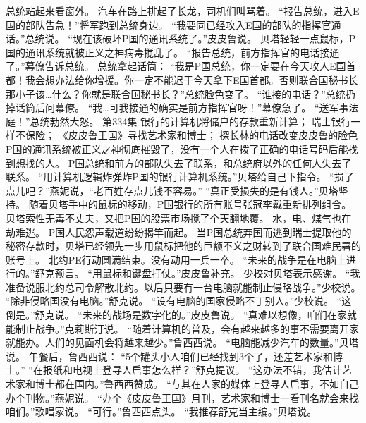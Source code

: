 \documentclass[a4paper,12pt,UTF8,twoside]{ctexbook}
\begin{document}
        总统站起来看窗外。  
        汽车在路上排起了长龙，司机们叫骂着。  
        “报告总统，进入E国的部队告急！”将军跑到总统身边。  
        “我要同已经攻入E国的部队的指挥官通话。”总统说。  
        “现在该破坏P国的通讯系统了。”皮皮鲁说。  
        贝塔轻轻一点鼠标，P国的通讯系统就被正义之神病毒搅乱了。  
        “报告总统，前方指挥官的电话接通了。”幕僚告诉总统。  
        总统拿起话筒：  
      “我是P国总统，你一定要在今天攻人E国首都！我会想办法给你增援。你一定不能迟于今天拿下E国首都。否则联合国秘书长那小子该…什么？你就是联合国秘书长？”总统脸色变了。        
        “谁接的电话？”总统扔掉话筒后问幕僚。  
        “我…可我接通的确实是前方指挥官呀！”幕僚急了。  
        “送军事法庭！”总统勃然大怒。          第334集  
        银行的计算机将储户的存款重新计算；  
        瑞士银行一样不保险；  
        《皮皮鲁王国》寻找艺术家和博士；  
        探长林的电话改变皮皮鲁的脸色    
        P国的通讯系统被正义之神彻底摧毁了，没有一个人在拨了正确的电话号码后能找到想找的人。  
        P国总统和前方的部队失去了联系，和总统府以外的任何人失去了联系。  
        “用计算机逻辑炸弹炸P国的银行计算机系统。”贝塔给自己下指令。  
        “损了点儿吧？”燕妮说，“老百姓存点儿钱不容易。”  
        “真正受损失的是有钱人。”贝塔坚持。  
        随着贝塔手中的鼠标的移动，P国银行的所有账号张冠李戴重新排列组合。  
        贝塔索性无毒不丈夫，又把P国的股票市场搅了个天翻地覆。  
        水，电、煤气也在劫难逃。  
        P国人民怨声载道纷纷揭竿而起。  
        当P国总统弃国而逃到瑞士提取他的秘密存款时，贝塔已经领先一步用鼠标把他的巨额不义之财转到了联合国难民署的账号上。  
        北约PE行动圆满结束。没有动用一兵一卒。  
        “未来的战争是在电脑上进行的。”舒克预言。  
        “用鼠标和键盘打仗。”皮皮鲁补充。  
        少校对贝塔表示感谢。  
        “我准备说服北约总司令解散北约。以后只要有一台电脑就能制止侵略战争。”少校说。  
        “除非侵略国没有电脑。”舒克说。  
        “设有电脑的国家侵略不丁别人。”少校说。  
        “这倒是。”舒克说。  
        “未来的战场是数字化的。”皮皮鲁说。  
        “真难以想像，咱们在家就能制止战争。”克莉斯汀说。  
        “随着计算机的普及，会有越来越多的事不需要离开家就能办。人们的见面机会将越来越少。”鲁西西说。  
        “电脑能减少汽车的数量。”贝塔说。        
        午餐后，鲁西西说：  
        “5个罐头小人咱们已经找到3个了，还差艺术家和博士。”  
        “在报纸和电视上登寻人启事怎么样？”舒克提议。  
        “这办法不错，我估计艺术家和博士都在国内。”鲁西西赞成。  
        “与其在人家的媒体上登寻人启事，不如自己办个刊物。”燕妮说。  
        “办个《皮皮鲁王国》月刊，艺术家和博士一看刊名就会来找咱们。”歌唱家说。  
        “可行。”鲁西西点头。  
        “我推荐舒克当主编。”贝塔说。  
\end{document}

